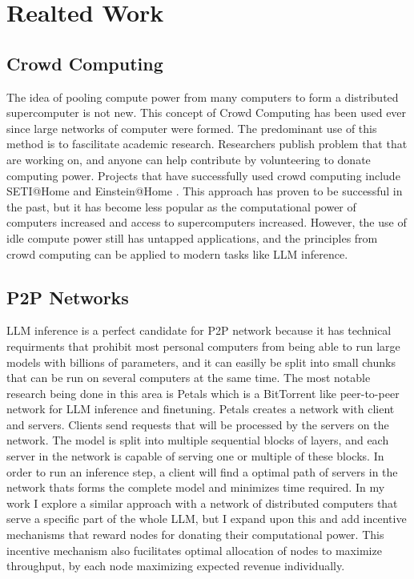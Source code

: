 \documentclass[preprint,twoside,11pt]{article}
\begin{document}
\section{Realted Work}

\subsection{Crowd Computing}

The idea of pooling compute power from many computers to form a distributed supercomputer is not new. This concept of Crowd Computing
has been used ever since large networks of computer were formed. The predominant use of this method is to fascilitate academic research.
Researchers publish problem that that are working on, and anyone can help contribute by volunteering to donate computing power.
Projects that have successfully used crowd computing include SETI@Home \citep{10.1145/581571.581573} and Einstein@Home \citep{Steltner_2021}.
This approach has proven to be successful in the past, but it has become less popular as the computational power of computers increased and access to supercomputers increased.
However, the use of idle compute power still has untapped applications, and the principles from crowd computing can be applied to modern tasks like LLM inference.

\subsection{P2P Networks}

LLM inference is a perfect candidate for P2P network because it has technical requirments that prohibit most personal computers from being able to run
large models with billions of parameters, and it can easilly be split into small chunks that can be run on several computers at the same time. The most notable research
being done in this area is Petals \citep{borzunov2023petalscollaborativeinferencefinetuning} which is a BitTorrent like peer-to-peer network for LLM inference and finetuning.
Petals creates a network with client and servers. Clients send requests that will be processed by the servers on the network. The model is split into multiple sequential blocks of layers, and each server
in the network is capable of serving one or multiple of these blocks. In order to run an inference step, a client will find a optimal path of servers
in the network thats forms the complete model and minimizes time required. In my work I explore a similar approach with a network of distributed computers that serve a specific part of the whole LLM,
but I expand upon this and add incentive mechanisms that reward nodes for donating their computational power. This incentive mechanism also fucilitates optimal allocation of nodes to maximize throughput, by each
node maximizing expected revenue individually.
\end{document}
